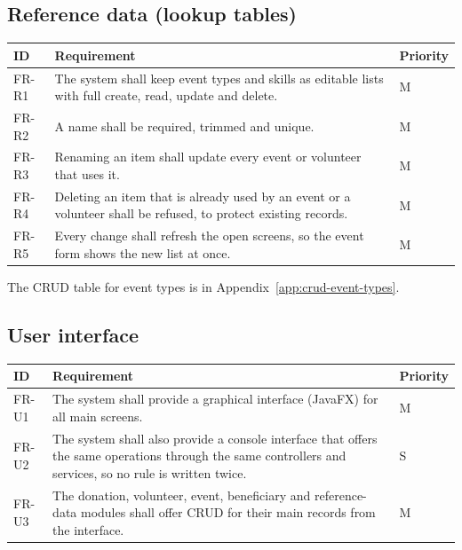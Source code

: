 \subsection{Reference data (lookup tables)}

\begin{center}
\footnotesize
\begin{tabularx}{\textwidth}{@{}L{0.09\textwidth}YL{0.11\textwidth}@{}}
\toprule
\textbf{ID} & \textbf{Requirement} & \textbf{Priority} \\
\midrule
FR-R1 & The system shall keep event types and skills as editable lists with full create, read, update and delete. & M \\
FR-R2 & A name shall be required, trimmed and unique. & M \\
FR-R3 & Renaming an item shall update every event or volunteer that uses it. & M \\
FR-R4 & Deleting an item that is already used by an event or a volunteer shall be refused, to protect existing records. & M \\
FR-R5 & Every change shall refresh the open screens, so the event form shows the new list at once. & M \\
\bottomrule
\end{tabularx}
\end{center}

The CRUD table for event types is in Appendix~\ref{app:crud-event-types}.

\subsection{User interface}

\begin{center}
\footnotesize
\begin{tabularx}{\textwidth}{@{}L{0.09\textwidth}YL{0.11\textwidth}@{}}
\toprule
\textbf{ID} & \textbf{Requirement} & \textbf{Priority} \\
\midrule
FR-U1 & The system shall provide a graphical interface (JavaFX) for all main screens. & M \\
FR-U2 & The system shall also provide a console interface that offers the same operations through the same controllers and services, so no rule is written twice. & S \\
FR-U3 & The donation, volunteer, event, beneficiary and reference-data modules shall offer CRUD for their main records from the interface. & M \\
\bottomrule
\end{tabularx}
\end{center}
